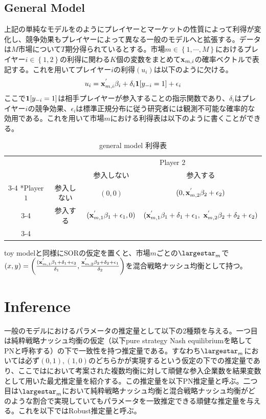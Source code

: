 \documentclass{jsarticle}
\begin{document}
\subsection{General Model}
上記の単純なモデルを\cite{Tamer2003a}のようにプレイヤーとマーケットの性質によって利得が変化し、競争効果もプレイヤーによって異なる一般のモデルへと拡張する。データは$M$市場について$T$期分得られているとする。市場$m \in \left\{ 1, \cdots, M\right\}$におけるプレイヤー$i \in \left\{ 1,2\right\}$の利得に関わる$K$個の変数をまとめて${\bf x}_{m, i}$の確率ベクトルで表記する。これを用いてプレイヤー$i$の利得$(u_i)$は以下のように欠ける。
\begin{align*}
	u_i = {\bf x}_{m, i}^{'} \beta_i + \delta_i {\bf 1}[y_{-i} = 1]+ \epsilon_i
\end{align*}
ここで${\bf 1}[y_{-i} = 1]$は相手プレイヤーが参入することの指示関数であり、$\delta_i$はプレイヤー$i$の競争効果、$\epsilon_i$は標準正規分布に従う研究者には観測不可能な確率的な効用である。これを用いて市場$m$における利得表は以下のように書くことができる。
\begin{table}[h]
    \caption{general model 利得表}
    \centering
    \setlength{\extrarowheight}{2pt}
    \begin{tabular}{cc|c|c|}
      & \multicolumn{1}{c}{} & \multicolumn{2}{c}{Player $2$}\\
      & \multicolumn{1}{c}{} & \multicolumn{1}{c}{参入しない}  & \multicolumn{1}{c}{参入する} \\\cline{3-4}
      \multirow{2}*{Player $1$}  & 参入しない & $(0,0)$ & $(0,{\bf x}_{m, 2}^{'} \beta_2+\epsilon_2)$ \\\cline{3-4}
      & 参入する & $({\bf x}_{m, 1}^{'} \beta_1+\epsilon_1,0)$ & $({\bf x}_{m, 1}^{'} \beta_1+\delta_1+\epsilon_1,\ {\bf x}_{m, 2}^{'} \beta_2+\delta_2+\epsilon_2)$ \\\cline{3-4}
    \end{tabular}
\end{table}

toy modelと同様にSORの仮定を置くと、市場$m$ごとの$\largestar_m$で$(x, y) = \left( \frac{({\bf x}_{m, 1}^{'} \beta_1 + \delta_1 + \epsilon_2}{\delta_1} ,  \frac{{\bf x}_{m, 2}^{'} \beta_2 + \delta_2 + \epsilon_1}{\delta_2} \right)$を混合戦略ナッシュ均衡として持つ。


\section{Inference}
一般のモデルにおけるパラメータの推定量として以下の2種類を与える。一つ目は純粋戦略ナッシュ均衡の仮定（以下pure strategy Nash equilibriumを略してPNと呼称する）の下で一致性を持つ推定量である。すなわち$\largestar_m$においては必ず$(0,1), (1,0)$のどちらかが実現するという仮定の下での推定量であり、ここでは\cite{Bresnahan1991}において考案された複数均衡に対して頑健な参入企業数を結果変数として用いた最尤推定量を紹介する。この推定量を以下PN推定量と呼ぶ。二つ目は$\largestar_m$において純粋戦略ナッシュ均衡と混合戦略ナッシュ均衡がどのような割合で実現していてもパラメータを一致推定できる頑健な推定量を与える。これを以下ではRobust推定量と呼ぶ。
\end{document}
